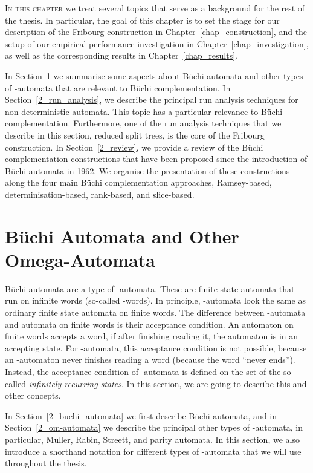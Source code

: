 \lettrine{I}{n this chapter} we treat several topics that serve as a background for the rest of the thesis. In particular, the goal of this chapter is to set the stage for our description of the Fribourg construction in Chapter~\ref{chap_construction}, and the setup of our empirical performance investigation in Chapter~\ref{chap_investigation}, as well as the corresponding results in Chapter~\ref{chap_results}.

In Section~\ref{2_automata} we summarise some aspects about Büchi automata and other types of \om-automata that are relevant to Büchi complementation. In Section~\ref{2_run_analysis}, we describe the principal run analysis techniques for non-deterministic automata. This topic has a particular relevance to Büchi complementation. Furthermore, one of the run analysis techniques that we describe in this section, reduced split trees, is the core of the Fribourg construction. In Section~\ref{2_review}, we provide a review of the Büchi complementation constructions that have been proposed since the introduction of Büchi automata in 1962. We organise the presentation of these constructions along the four main Büchi complementation approaches, Ramsey-based, determinisation-based, rank-based, and slice-based.

\section{Büchi Automata and Other Omega-Automata}
\label{2_automata}
Büchi automata are a type of \om-automata. These are finite state automata that run on infinite words (so-called \om-words). In principle, \om-automata look the same as ordinary finite state automata on finite words. The difference between \om-automata and automata on finite words is their acceptance condition. An automaton on finite words accepts a word, if after finishing reading it, the automaton is in an accepting state. For \om-automata, this acceptance condition is not possible, because an \om-automaton never finishes reading a word (because the word ``never ends''). Instead, the acceptance condition of \om-automata is defined on the set of the so-called \textit{infinitely recurring states}. In this section, we are going to describe this and other concepts.

In Section~\ref{2_buchi_automata} we first describe Büchi automata, and in Section~\ref{2_om-automata} we describe the principal other types of \om-automata, in particular, Muller, Rabin, Streett, and parity automata. In this section, we also introduce a shorthand notation for different types of \om-automata that we will use throughout the thesis.

